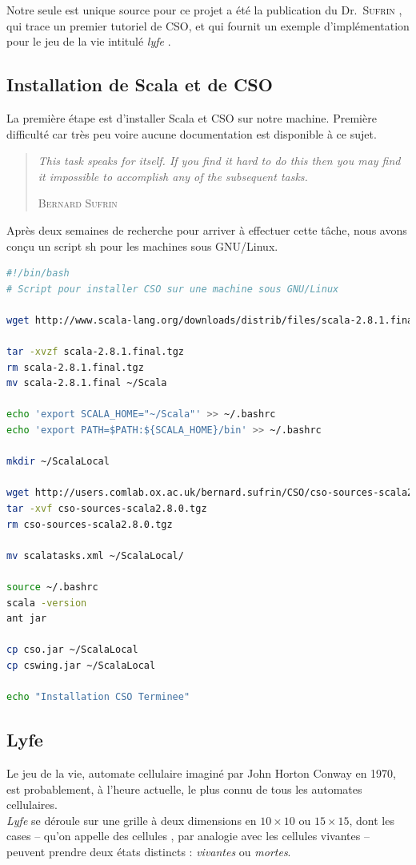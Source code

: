 \documentclass[a4paper,11pt,french]{report}
\begin{document}
Notre seule est unique source pour ce projet a été la publication du Dr.\ \textsc{Sufrin} \cite{cpa2008-cso}, qui trace un premier tutoriel de CSO, et qui fournit un exemple d'implémentation pour le jeu de la vie intitulé \og \emph{lyfe} \fg.\\

\subsection{Installation de Scala et de CSO}

La première étape est d'installer Scala et CSO sur notre machine. Première difficulté car très peu voire aucune documentation est disponible à ce sujet. 

\begin{quotation}
\textit{\og This task speaks for itself. If you find it hard to do this then you may find it impossible
to accomplish any of the subsequent tasks.\fg}
\begin{flushright}
\textsc{Bernard Sufrin}
\end{flushright}
\end{quotation}
Après deux semaines de recherche pour arriver à effectuer cette tâche, nous avons conçu un script \textsf{sh} pour les machines sous GNU/Linux.\\

\begin{lstlisting}[frame=trBL, language=bash, title={install\_{}cso.sh}]
#!/bin/bash
# Script pour installer CSO sur une machine sous GNU/Linux

wget http://www.scala-lang.org/downloads/distrib/files/scala-2.8.1.final.tgz

tar -xvzf scala-2.8.1.final.tgz
rm scala-2.8.1.final.tgz
mv scala-2.8.1.final ~/Scala

echo 'export SCALA_HOME="~/Scala"' >> ~/.bashrc
echo 'export PATH=$PATH:${SCALA_HOME}/bin' >> ~/.bashrc

mkdir ~/ScalaLocal

wget http://users.comlab.ox.ac.uk/bernard.sufrin/CSO/cso-sources-scala2.8.0.tgz
tar -xvf cso-sources-scala2.8.0.tgz
rm cso-sources-scala2.8.0.tgz

mv scalatasks.xml ~/ScalaLocal/

source ~/.bashrc
scala -version
ant jar

cp cso.jar ~/ScalaLocal
cp cswing.jar ~/ScalaLocal

echo "Installation CSO Terminee"
\end{lstlisting}
\subsection{Lyfe}
Le jeu de la vie, automate cellulaire imaginé par John Horton Conway en 1970, est probablement, à l’heure actuelle, le plus connu de tous les automates cellulaires.\\
\emph{Lyfe} se déroule sur une grille à deux dimensions en $10\times 10$ ou $15\times 15$, dont les cases -- qu’on appelle des \og cellules \fg, par analogie avec les cellules vivantes -- peuvent prendre deux états distincts : \emph{vivantes} ou \emph{mortes}.\\
\end{document}
